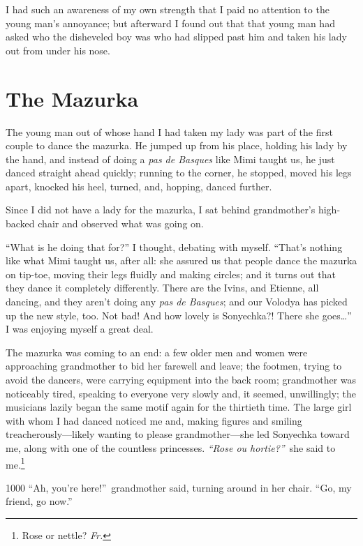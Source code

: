 I had such an awareness of my own strength that I paid no attention to the young man's annoyance; but afterward I found out that that young man had asked who the disheveled boy was who had slipped past him and taken his lady out from under his nose.

\chapter{The Mazurka} %

The young man out of whose hand I had taken my lady was part of the first couple to dance the mazurka. He jumped up from his place, holding his lady by the hand, and instead of doing a \textit{pas de Basques} like Mimi taught us, he just danced straight ahead quickly; running to the corner, he stopped, moved his legs apart, knocked his heel, turned, and, hopping, danced further.

Since I did not have a lady for the mazurka, I sat behind grandmother's high-backed chair and observed what was going on.

``What is he doing that for?'' I thought, debating with myself. ``That's nothing like what Mimi taught us, after all: she assured us that people dance the mazurka on tip-toe, moving their legs fluidly and making circles; and it turns out that they dance it completely differently. There are the Ivins, and Etienne, all dancing, and they aren't doing any \textit{pas de Basques}; and our Volodya has picked up the new style, too. Not bad! And how lovely is Sonyechka?! There she goes\ldots{}'' I was enjoying myself a great deal. %

The mazurka was coming to an end: a few older men and women were approaching grandmother to bid her farewell and leave; the footmen, trying to avoid the dancers, were carrying equipment into the back room; grandmother was noticeably tired, speaking to everyone very slowly and, it seemed, unwillingly; the musicians lazily began the same motif again for the thirtieth time. The large girl with whom I had danced noticed me and, making figures and smiling treacherously---likely wanting to please grandmother---she led Sonyechka toward me, along with one of the countless princesses. \textit{``Rose ou hortie?''}~she said to me.\footnote{Rose or nettle? \textit{Fr.}} %

\begin{tolerant}{1000}
``Ah, you're here!''~grandmother said, turning around in her chair. ``Go, my friend, go now.'' %
\end{tolerant}

